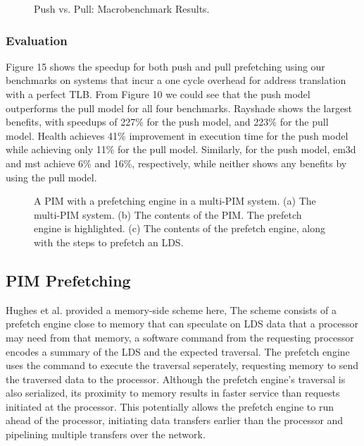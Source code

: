 \documentclass{acm_proc_article-sp}
\begin{document}
\begin{figure}
\centering
{}
\caption{Push vs. Pull: Macrobenchmark Results.\cite{Yang:2002:PMH:646349.690705}}
\end{figure}

\subsubsection{Evaluation}
Figure 15 shows the speedup for both push and pull 
prefetching using our benchmarks on systems that incur a 
one cycle overhead for address translation with a perfect 
TLB. From Figure 10 we could see that the push model outperforms the
pull model for all four benchmarks. Rayshade  
shows the largest benefits, with speedups of 227\% for the 
push model, and 223\% for the pull model. Health achieves 
41\% improvement in execution time for the push model 
while achieving only 11\% for the pull model. Similarly, for 
the push model, em3d and mst achieve 6\% and 16\%, respectively, while
neither shows any benefits by using the pull model.  

\begin{figure*}
\centering
{}
\caption{A PIM with a prefetching engine in a multi-PIM system. (a)
  The multi-PIM system. 
(b) The contents of the PIM. The prefetch engine is highlighted. (c)
The contents of the prefetch engine, along with the steps to prefetch an LDS.}
\end{figure*}

\subsection{PIM Prefetching}


Hughes et al. provided a memory-side scheme here, The scheme consists
of a prefetch engine close to memory that can speculate on LDS data
that a processor may need from that memory, a software command from
the requesting processor encodes a summary of the LDS and the expected
traversal. The prefetch engine uses the command to execute the
traversal seperately, requesting memory to send the traversed data to the
processor. Although the prefetch engine’s traversal is also
serialized, its proximity to memory results in faster service than
requests initiated at the processor. This potentially allows the
prefetch engine to run ahead of the processor, initiating data
transfers earlier than the processor and pipelining multiple
transfers over the network.\cite{Hughes:2005:MPL:1066486.1066491}
\end{document}
